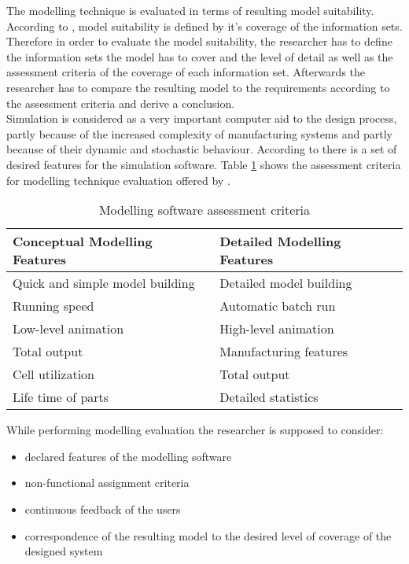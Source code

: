 The modelling technique is evaluated in terms of resulting model suitability. According to \cite{modelSuit}, model suitability is defined by it's coverage of the information sets. Therefore in order to evaluate the model suitability, the researcher has to define the information sets the model has to cover and the level of detail as well as the assessment criteria of the coverage of each information set. Afterwards the researcher has to compare the resulting model to the requirements according to the assessment criteria and derive a conclusion. \\ 

Simulation is considered as a very important computer aid to the design process, partly because of the increased complexity of manufacturing systems and partly because of their dynamic and stochastic behaviour\cite{Eldabi2001}. According to \cite{law2} there is a set of desired features for the simulation software. Table \ref{tab:modeling_assessment} shows the assessment criteria for modelling technique evaluation offered by \cite{Eldabi2001}.\\

\begin{table}[htpb]
  \caption[Assessment criteria]{Modelling software assessment criteria}\label{tab:modeling_assessment}
  \centering
  \begin{tabular}{l l}
    \toprule
       Conceptual Modelling Features & Detailed Modelling Features\\
    \midrule
    Quick and simple model building & Detailed model building \\ 
    Running speed & Automatic batch run \\
    Low-level animation & High-level animation\\
	Total output & Manufacturing features\\
	Cell utilization & Total output\\
	Life time of parts & Detailed statistics\\
    \bottomrule
  \end{tabular}
\end{table}

While performing modelling evaluation the researcher is supposed to consider: 
\begin{itemize}
\item declared features of the modelling software
\item non-functional assignment criteria
\item continuous feedback of the users
\item correspondence of the resulting model to the desired level of coverage of the designed system
\end{itemize}



